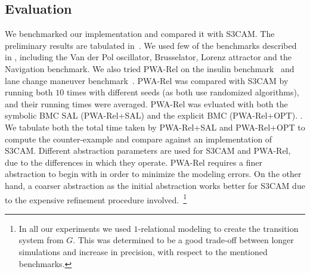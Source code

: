 

\subsection{Evaluation}

We benchmarked our implementation and compared it with S3CAM.  The
preliminary results are tabulated in~. We used few of
the benchmarks described in \cite{zutshi2014multiple}, including the
Van der Pol oscillator, Brusselator, Lorenz attractor and the
Navigation benchmark. We also tried PWA-Rel on the insulin
benchmark~\cite{chenformal} and lane change maneuver
benchmark~\cite{althoff2012reachability}. PWA-Rel was compared with
S3CAM by running both $10$ times with different seeds (as both use
randomized algorithms), and their running times were averaged. PWA-Rel
was evluated with both the symbolic BMC SAL (PWA-Rel+SAL) and the
explicit BMC (PWA-Rel+OPT).  . We
tabulate both the total time taken by PWA-Rel+SAL and PWA-Rel+OPT to
compute the counter-example and compare against an implementation of
S3CAM.  Different abstraction parameters are used for S3CAM and
PWA-Rel, due to the differences in which they operate. PWA-Rel
requires a finer abstraction to begin with in order to minimize the
modeling errors. On the other hand, a coarser abstraction as the
initial abstraction works better for S3CAM due to the expensive
refinement procedure involved.~\footnote{In all our experiments we
used $1$-relational modeling to create the transition system from $G$.
This was determined to be a good trade-off between longer simulations
and increase in precision, with respect to the mentioned benchmarks.}

